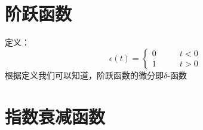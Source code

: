 \documentclass[UTF8]{ctexbook}
\begin{document}
		\section{阶跃函数}

			定义：
			\begin{equation}
				\epsilon(t)=\left\{
				\begin{aligned}
				0&\qquad t<0\\
				1&\qquad t>0
				\end{aligned}
				\right.
			\end{equation}
			根据定义我们可以知道，阶跃函数的微分即$\delta$-函数

		\section{指数衰减函数}
\end{document}
